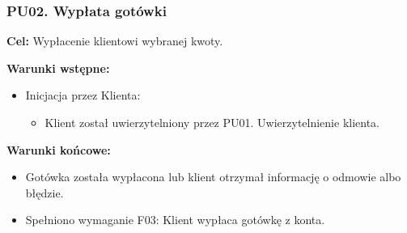 \documentclass[10pt,a4paper]{article}
\begin{document}
\subsubsection*{PU02. Wypłata gotówki}

\noindent\textbf{Cel:} Wypłacenie klientowi wybranej kwoty.

\noindent\textbf{Warunki wstępne:}
\begin{itemize}
    \item Inicjacja przez Klienta:
    \begin{itemize}
        \item Klient został uwierzytelniony przez PU01. Uwierzytelnienie klienta.
    \end{itemize}
\end{itemize}

\noindent\textbf{Warunki końcowe:}
\begin{itemize}
    \item Gotówka została wypłacona lub klient otrzymał informację o odmowie albo błędzie.
    \item Spełniono wymaganie F03: Klient wypłaca gotówkę z konta.
\end{itemize}
\end{document}
